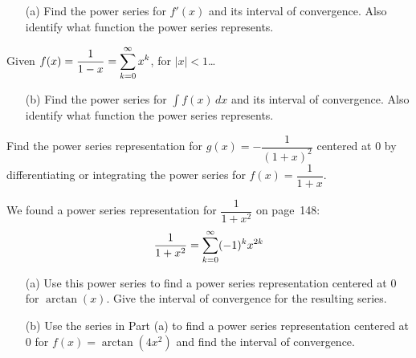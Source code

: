 \documentclass[12pt]{article}
\begin{document}
\begin{enumerate}
\item[(a)] Find the power series for $f'(x)$ and its  interval of convergence. Also identify what function the power series represents.

\vfill

\end{enumerate}

\newpage

\ExampleCont Given $f(x)=\dfrac{1}{1-x}=\displaystyle\sum_{k=0}^\infty x^k$, for $|x|<1$\dots 

\begin{enumerate}
\item[(b)] Find the power series for $\int f(x)\,dx$ and its interval of convergence. Also identify what function the power series represents.

\vfill
\end{enumerate}




\Example Find the power series representation for $g(x)=-\dfrac{1}{(1+x)^2}$ centered at $0$ by differentiating or integrating the power series for $f(x)=\dfrac{1}{1+x}$.

\vfill

\newpage

\Example We found a power series representation for $\dfrac{1}{1+x^2}$ on page~148:
$$\dfrac{1}{1+x^2}=\displaystyle\sum_{k=0}^\infty (-1)^k x^{2k}$$

\begin{enumerate}
\item[(a)] Use this power series to find a power series representation centered at $0$ for $\arctan(x)$. Give the interval of convergence for the resulting series.

\vfill

\item[(b)] Use the series in Part (a) to find a power series representation centered at $0$ for \mbox{$f(x)=\arctan(4x^2)$} and find the interval of convergence.

\vfill
\end{enumerate}
\end{document}
